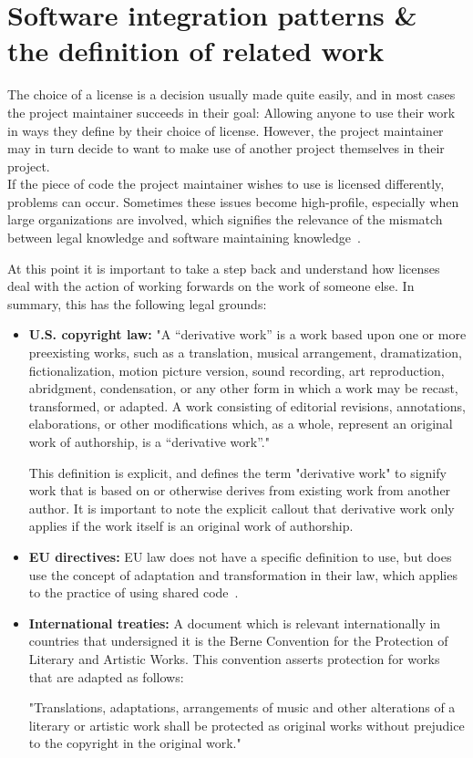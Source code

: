 \section{Software integration patterns \& the definition of related work}

The choice of a license is a decision usually made quite easily, and in most cases the project maintainer succeeds in their goal: Allowing anyone to use their work in ways they define by their choice of license. However, the project maintainer may in turn decide to want to make use of another project themselves in their project. \\

If the piece of code the project maintainer wishes to use is licensed differently, problems can occur. Sometimes these issues become high-profile, especially when large organizations are involved, which signifies the relevance of the mismatch between legal knowledge and software maintaining knowledge~\cite{lkml-tuxcomputers,tuxedocomputers-issue-127,tuxedocomputers-issue-61}.

At this point it is important to take a step back and understand how licenses deal with the action of working forwards on the work of someone else. In summary, this has the following legal grounds:
\begin{itemize}
	\item \textbf{U.S. copyright law:} "A “derivative work” is a work based upon one or more preexisting works, such as a translation, musical arrangement, dramatization, fictionalization, motion picture version, sound recording, art reproduction, abridgment, condensation, or any other form in which a work may be recast, transformed, or adapted. A work consisting of editorial revisions, annotations, elaborations, or other modifications which, as a whole, represent an original work of authorship, is a “derivative work”."~\cite{us-copyright-law-definitions}
	
	This definition is explicit, and defines the term "derivative work" to signify work that is based on or otherwise derives from existing work from another author. It is important to note the explicit callout that derivative work only applies if the work itself is an original work of authorship.
	
	\item \textbf{EU directives:} EU law does not have a specific definition to use, but does use the concept of adaptation and transformation in their law, which applies to the practice of using shared code~\cite{eu-infosoc-directive}.
	
	\item \textbf{International treaties:} A document which is relevant internationally in countries that undersigned it is the Berne Convention for the Protection of Literary and Artistic Works. This convention asserts protection for works that are adapted as follows:
	
	"Translations, adaptations, arrangements of music and other alterations of a literary or artistic work shall be protected as original works without prejudice to the copyright in the original work."~\cite{berne-convention}
\end{itemize}

